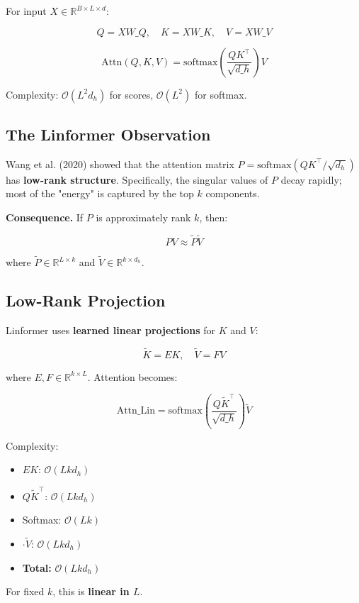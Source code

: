 For input $X \in \mathbb{R}^{B \times L \times d}$:

\[
Q = X W\_Q, \quad K = X W\_K, \quad V = X W\_V
\tag{3.1}
\]

\[
\text{Attn}(Q, K, V) = \text{softmax}\!\left(\frac{Q K^\top}{\sqrt{d\_h}}\right) V
\tag{3.2}
\]

Complexity: $\mathcal{O}(L^2 d_h)$ for scores, $\mathcal{O}(L^2)$ for softmax.

\subsection{The Linformer Observation}

Wang et al. (2020) showed that the attention matrix $P = \text{softmax}(QK^\top/\sqrt{d_h})$ 
has \textbf{low-rank structure}. Specifically, the singular values of $P$ decay 
rapidly; most of the "energy" is captured by the top $k$ components.

\textbf{Consequence.} If $P$ is approximately rank $k$, then:

\[
P V \approx \tilde{P} \tilde{V}
\tag{3.3}
\]

where $\tilde{P} \in \mathbb{R}^{L \times k}$ and $\tilde{V} \in \mathbb{R}^{k \times d_h}$.

\subsection{Low-Rank Projection}

Linformer uses \textbf{learned linear projections} for $K$ and $V$:

\[
\tilde{K} = E K, \quad \tilde{V} = F V
\tag{3.4}
\]

where $E, F \in \mathbb{R}^{k \times L}$. Attention becomes:

\[
\text{Attn}\_\text{Lin} = \text{softmax}\!\left(\frac{Q \tilde{K}^\top}{\sqrt{d\_h}}\right) \tilde{V}
\tag{3.5}
\]

Complexity: 
\begin{itemize}
\item $E K$: $\mathcal{O}(L k d_h)$
\item $Q \tilde{K}^\top$: $\mathcal{O}(L k d_h)$
\item Softmax: $\mathcal{O}(L k)$
\item $\cdot \tilde{V}$: $\mathcal{O}(L k d_h)$
\item \textbf{Total:} $\mathcal{O}(L k d_h)$

\end{itemize}
For fixed $k$, this is \textbf{linear in $L$}.

